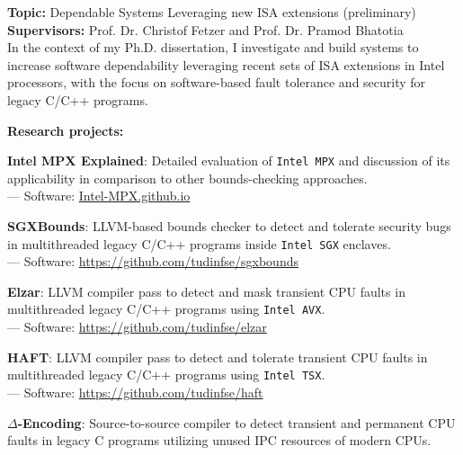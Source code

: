 \documentclass[letterpaper]{article}
\renewenvironment{itemize}{
  \begin{list}{}{
    \setlength{\leftmargin}{1.5em}
  }
}{
  \end{list}
}
\begin{document}
\begin{itemize}
\item {\bf Topic:} Dependable Systems Leveraging new ISA extensions (preliminary)\\
{\bf Supervisors:} Prof. Dr. Christof Fetzer and Prof. Dr. Pramod Bhatotia\vspace{-13pt}\\

In the context of my Ph.D. dissertation, I investigate and build systems to increase software dependability leveraging recent sets of ISA extensions in Intel processors, with the focus on software-based fault tolerance and security for legacy C/C++ programs. %

{\bf Research projects:}
	\begin{itemize}%
	
		\item  {\bf Intel MPX Explained}: Detailed evaluation of {\tt Intel MPX} and discussion of its applicability in comparison to other bounds-checking approaches.\\
			--- Software: \href{https://intel-mpx.github.io/}{Intel-MPX.github.io}
		
		\item {\bf SGXBounds}: LLVM-based bounds checker to detect and tolerate security bugs in multithreaded legacy C/C++ programs inside {\tt Intel SGX} enclaves.\\
			--- Software: \href{https://github.com/tudinfse/sgxbounds}{https://github.com/tudinfse/sgxbounds}
			
			
		\item {\bf Elzar}: LLVM compiler pass to detect and mask transient CPU faults in multithreaded legacy C/C++ programs using {\tt Intel AVX}.\\
		 --- Software: \href{https://github.com/tudinfse/elzar}{https://github.com/tudinfse/elzar}
		 
		\item {\bf HAFT}: LLVM compiler pass to detect and tolerate transient CPU faults in multithreaded legacy C/C++ programs using {\tt Intel TSX}.\\
				--- Software: \href{https://github.com/tudinfse/haft}{https://github.com/tudinfse/haft}
				
		\item {\bf $\Delta$-Encoding}: Source-to-source compiler to detect transient and permanent CPU faults in legacy C programs utilizing unused IPC resources of modern CPUs.
	\end{itemize}%
\end{itemize}%
\end{document}
